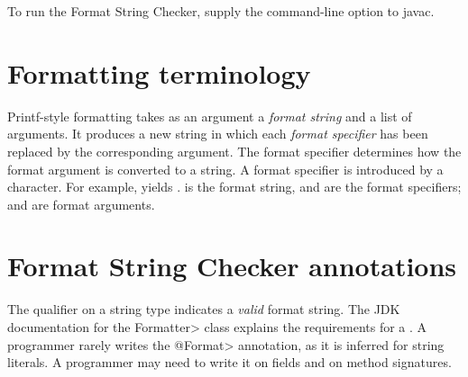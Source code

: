 To run the Format String Checker, supply the
 command-line option to javac. 

\section{Formatting terminology\label{formatter-terminology}}

Printf-style formatting takes as an argument a \emph{format string} and a
list of arguments.  It produces a new string in which each \emph{format
  specifier} has been replaced by the corresponding argument.
The format specifier determines how the format argument is converted to a
string.
A format specifier is introduced by a \code{\%} character. For example,
 yields
.   is
the format string,  and  are the format specifiers;
 and  are format arguments.


\section{Format String Checker annotations\label{formatter-annotations}}

The  qualifier on a string type
indicates a \emph{valid} format string.  The JDK documentation for the
\<Formatter> class explains the requirements for a
.
A programmer rarely writes the \<@Format> annotation, as it is inferred for
string literals.  A programmer may need to write it on fields and on method
signatures.


